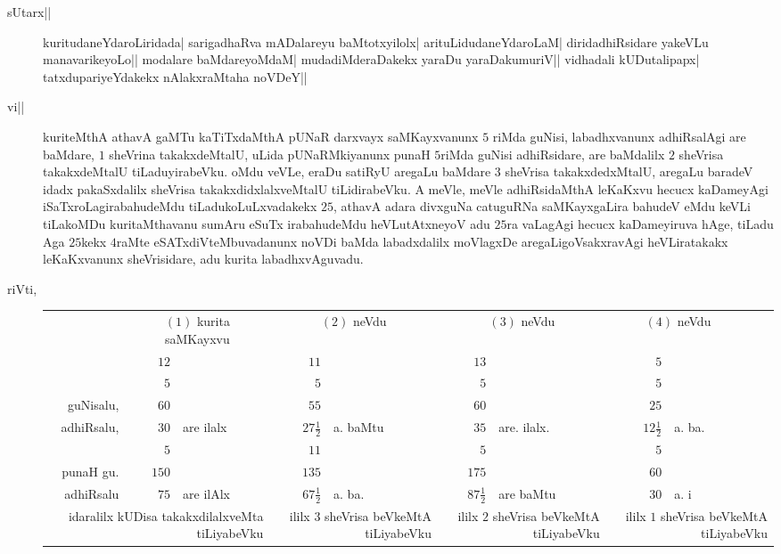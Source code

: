 \vskip 2cm



\begin{description}
\item[sUtarx||] kuritudaneYdaroLiridada| sarigadhaRva mADalareyu
  baMtotxyilolx| arituLidudaneYdaroLaM| diridadhiRsidare yakeVLu
  manavarikeyoLo|| modalare baMdareyoMdaM| mudadiMderaDakekx yaraDu
  yaraDakumuriV|| vidhadali kUDutalipapx| tatxdupariyeYdakekx
  nAlakxraMtaha noVDeY||

\item[vi||] kuriteMthA athavA gaMTu kaTiTxdaMthA pUNaR darxvayx
  saMKayxvanunx $5$ riMda guNisi, labadhxvanunx adhiRsalAgi are
  baMdare, $1$ sheVrina takakxdeMtalU, uLida pUNaRMkiyanunx punaH
  $5$riMda guNisi adhiRsidare, are baMdalilx $2$ sheVrisa
  takakxdeMtalU tiLaduyirabeVku. oMdu veVLe, eraDu satiRyU aregaLu
  baMdare $3$ sheVrisa takakx\-dedxMtalU, aregaLu baradeV idadx
  pakaSxdalilx sheVrisa takakxdidxlalxveMtalU tiLidirabeVku. A meVle,
  meVle adhiRsidaMthA leKaKxvu hecucx kaDameyAgi
  iSaTxroLagirabahudeMdu tiLadukoLuLxvadakekx $25$, athavA adara
  divxguNa catuguRNa saMKayxgaLira bahudeV eMdu keVLi tiLakoMDu
  kuritaMthavanu sumAru eSuTx irabahudeMdu heVLutAtxneyoV adu $25$ra
  vaLagAgi hecucx kaDameyiruva hAge, tiLadu Aga $25$kekx $4$raMte
  eSATxdiVteMbuvadanunx noVDi baMda labadxdalilx moVlagxDe
  aregaLigoVsakxravAgi heVLiratakakx leKaKxvanunx sheVrisidare, adu
  kurita labadhxvAguvadu.

\item[riVti,] 


\renewcommand{\arraystretch}{1.2}
\setlength\tabcolsep{4pt}
  \begin{tabular}[t]{rrlrlrlrll}
    & \multicolumn{2}{c}{$(1)$ kurita saMKayxvu} &
    \multicolumn{2}{c}{$(2)$ neVdu} &
    \multicolumn{2}{c}{$(3)$ neVdu} &
    \multicolumn{2}{c}{$(4)$ neVdu} \\[6pt]
    & $12$ && $11$ && $13$ && $5$&\\
    & $5$ && $5$ && $5$ && $5$&\\    
    \hline
    guNisalu, & $60$ && $55$ && $60$ && $25$\\
    \hline
    adhiRsalu, & $30$ &are ilalx& $27\frac{1}{2}$ &a. baMtu& $35$
    &are. ilalx.& $12 \frac{1}{2}$& a. ba.\\
    &     $5$ && $11$ && $5$ && $5$ &\\
    \hline
    punaH gu. & $150$ && $135$ && $175$ && $60$\\
    \hline
    adhiRsalu & $75$ &are ilAlx & $67\frac{1}{2}$ & a. ba. & $87
    \frac{1}{2}$ & are baMtu & $30$ &a. i\\
    \multicolumn{3}{p{3cm}}{idaralilx kUDisa takakxdilalxveMta tiLiyabeVku}
    & \multicolumn{2}{p{2cm}}{ililx $3$ sheVrisa beVkeMtA tiLiyabeVku} &
    \multicolumn{2}{p{2cm}}{ililx $2$ sheVrisa beVkeMtA tiLiyabeVku} &
    \multicolumn{3}{p{2cm}}{ililx $1$ sheVrisa beVkeMtA tiLiyabeVku}
  \end{tabular}


\end{description}
